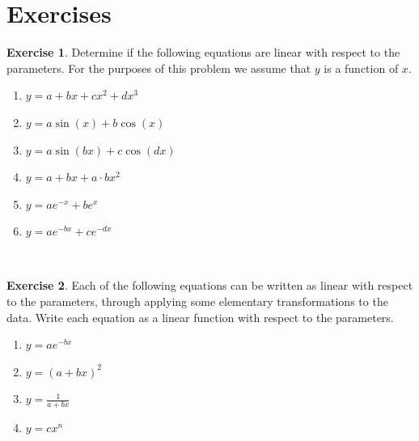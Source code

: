 \documentclass[
]{book}
\theoremstyle{definition}
\theoremstyle{definition}
\theoremstyle{definition}
\newtheorem{exercise}{Exercise}[chapter]
\theoremstyle{remark}
\begin{document}
\hypertarget{exercises-7}{%
\section{Exercises}\label{exercises-7}}

\begin{exercise}
\protect\hypertarget{exr:unnamed-chunk-146}{}{\label{exr:unnamed-chunk-146} }Determine if the following equations are linear with respect to the parameters. For the purposes of this problem we assume that \(y\) is a function of \(x\).

\begin{enumerate}[label=\alph*.]
\item $y=a + bx+cx^{2}+dx^{3}$
\item $y=a \sin (x) + b \cos (x)$
\item $y = a \sin(bx) + c \cos(dx)$
\item $y = a + bx + a\cdot b x^{2}$
\item $y = a e^{-x} + b e^{x}$
\item $y = a e^{-bx} + c e^{-dx}$
\end{enumerate}
\end{exercise}

~
\begin{exercise}
\protect\hypertarget{exr:unnamed-chunk-147}{}{\label{exr:unnamed-chunk-147} }Each of the following equations can be written as linear with respect to the parameters, through applying some elementary transformations to the data. Write each equation as a linear function with respect to the parameters.

\begin{enumerate}[label=\alph*.]
\item $y=ae^{-bx}$
\item $y=(a+bx)^{2}$
\item $\displaystyle y =  \frac{1}{a+bx}$
\item $y = c x^{n}$
\end{enumerate}
\end{exercise}

~
\end{document}
